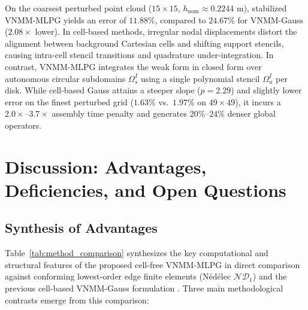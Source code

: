 \documentclass[VANCOUVER,Times1COL]{WileyNJD-v5}
\begin{document}
\begin{enumerate}
    On the coarsest perturbed point cloud ($15 \times 15$, $h_{\mathrm{nom}} \approx 0.2244\text{ m}$), stabilized VNMM-MLPG yields an error of $11.88\%$, compared to $24.67\%$ for VNMM-Gauss ($2.08\times$ lower). In cell-based methods, irregular nodal displacements distort the alignment between background Cartesian cells and shifting support stencils, causing intra-cell stencil transitions and quadrature under-integration. In contrast, VNMM-MLPG integrates the weak form in closed form over autonomous circular subdomains $\Omega_s^I$ using a single polynomial stencil $\Omega_u^I$ per disk. While cell-based Gauss attains a steeper slope ($p = 2.29$) and slightly lower error on the finest perturbed grid ($1.63\%$ vs.\ $1.97\%$ on $49\times 49$), it incurs a $2.0\times\text{--}3.7\times$ assembly time penalty and generates $20\%\text{--}24\%$ denser global operators.
\end{enumerate}

\section{Discussion: Advantages, Deficiencies, and Open Questions}
\label{sec:discussion}

\subsection{Synthesis of Advantages}
\label{subsec:advantages_synthesis}

Table~\ref{tab:method_comparison} synthesizes the key computational and structural features of the proposed cell-free VNMM-MLPG in direct comparison against conforming lowest-order edge finite elements (N\'{e}d\'{e}lec $\mathcal{ND}_1$) and the previous cell-based VNMM-Gauss formulation \cite{stable_vnmm2d_2026}. Three main methodological contrasts emerge from this comparison:
\end{document}
